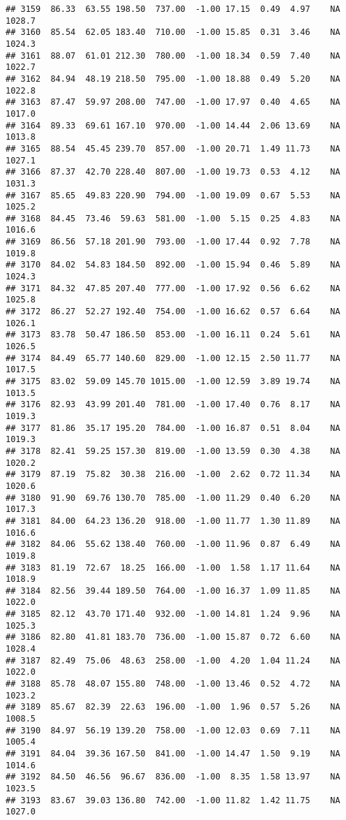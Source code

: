 \documentclass{article}\usepackage{graphicx, color}
\makeatletter
\newenvironment{kframe}{%
 \def\at@end@of@kframe{}%
 \ifinner\ifhmode%
  \def\at@end@of@kframe{\end{minipage}}%
  \begin{minipage}{\columnwidth}%
 \fi\fi%
 \def\FrameCommand##1{\hskip\@totalleftmargin \hskip-\fboxsep
 \colorbox{shadecolor}{##1}\hskip-\fboxsep
     \hskip-\linewidth \hskip-\@totalleftmargin \hskip\columnwidth}%
 \MakeFramed {\advance\hsize-\width
   \@totalleftmargin\z@ \linewidth\hsize
   \@setminipage}}%
 {\par\unskip\endMakeFramed%
 \at@end@of@kframe}
\newenvironment{knitrout}{}{} %
\makeatother
\begin{document}
\begin{knitrout}
\begin{kframe}
\begin{verbatim}
## 3159  86.33  63.55 198.50  737.00  -1.00 17.15  0.49  4.97    NA 1028.7
## 3160  85.54  62.05 183.40  710.00  -1.00 15.85  0.31  3.46    NA 1024.3
## 3161  88.07  61.01 212.30  780.00  -1.00 18.34  0.59  7.40    NA 1022.7
## 3162  84.94  48.19 218.50  795.00  -1.00 18.88  0.49  5.20    NA 1022.8
## 3163  87.47  59.97 208.00  747.00  -1.00 17.97  0.40  4.65    NA 1017.0
## 3164  89.33  69.61 167.10  970.00  -1.00 14.44  2.06 13.69    NA 1013.8
## 3165  88.54  45.45 239.70  857.00  -1.00 20.71  1.49 11.73    NA 1027.1
## 3166  87.37  42.70 228.40  807.00  -1.00 19.73  0.53  4.12    NA 1031.3
## 3167  85.65  49.83 220.90  794.00  -1.00 19.09  0.67  5.53    NA 1025.2
## 3168  84.45  73.46  59.63  581.00  -1.00  5.15  0.25  4.83    NA 1016.6
## 3169  86.56  57.18 201.90  793.00  -1.00 17.44  0.92  7.78    NA 1019.8
## 3170  84.02  54.83 184.50  892.00  -1.00 15.94  0.46  5.89    NA 1024.3
## 3171  84.32  47.85 207.40  777.00  -1.00 17.92  0.56  6.62    NA 1025.8
## 3172  86.27  52.27 192.40  754.00  -1.00 16.62  0.57  6.64    NA 1026.1
## 3173  83.78  50.47 186.50  853.00  -1.00 16.11  0.24  5.61    NA 1026.5
## 3174  84.49  65.77 140.60  829.00  -1.00 12.15  2.50 11.77    NA 1017.5
## 3175  83.02  59.09 145.70 1015.00  -1.00 12.59  3.89 19.74    NA 1013.5
## 3176  82.93  43.99 201.40  781.00  -1.00 17.40  0.76  8.17    NA 1019.3
## 3177  81.86  35.17 195.20  784.00  -1.00 16.87  0.51  8.04    NA 1019.3
## 3178  82.41  59.25 157.30  819.00  -1.00 13.59  0.30  4.38    NA 1020.2
## 3179  87.19  75.82  30.38  216.00  -1.00  2.62  0.72 11.34    NA 1020.6
## 3180  91.90  69.76 130.70  785.00  -1.00 11.29  0.40  6.20    NA 1017.3
## 3181  84.00  64.23 136.20  918.00  -1.00 11.77  1.30 11.89    NA 1016.6
## 3182  84.06  55.62 138.40  760.00  -1.00 11.96  0.87  6.49    NA 1019.8
## 3183  81.19  72.67  18.25  166.00  -1.00  1.58  1.17 11.64    NA 1018.9
## 3184  82.56  39.44 189.50  764.00  -1.00 16.37  1.09 11.85    NA 1022.0
## 3185  82.12  43.70 171.40  932.00  -1.00 14.81  1.24  9.96    NA 1025.3
## 3186  82.80  41.81 183.70  736.00  -1.00 15.87  0.72  6.60    NA 1028.4
## 3187  82.49  75.06  48.63  258.00  -1.00  4.20  1.04 11.24    NA 1022.0
## 3188  85.78  48.07 155.80  748.00  -1.00 13.46  0.52  4.72    NA 1023.2
## 3189  85.67  82.39  22.63  196.00  -1.00  1.96  0.57  5.26    NA 1008.5
## 3190  84.97  56.19 139.20  758.00  -1.00 12.03  0.69  7.11    NA 1005.4
## 3191  84.04  39.36 167.50  841.00  -1.00 14.47  1.50  9.19    NA 1014.6
## 3192  84.50  46.56  96.67  836.00  -1.00  8.35  1.58 13.97    NA 1023.5
## 3193  83.67  39.03 136.80  742.00  -1.00 11.82  1.42 11.75    NA 1027.0

\end{verbatim}
\end{kframe}
\end{knitrout}
\end{document}
